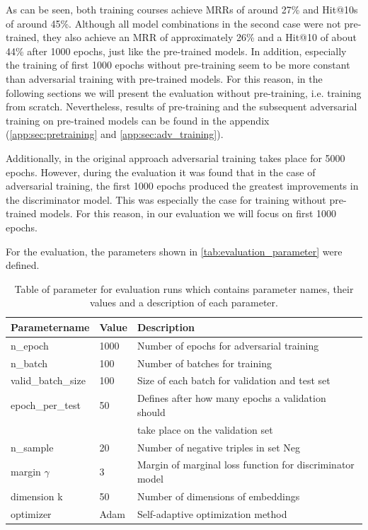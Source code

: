 As can be seen, both training courses achieve MRRs of around 27\% and Hit@10s of around 45\%.
Although all model combinations in the second case were not pre-trained, they also achieve an MRR of approximately 26\% and a Hit@10 of about 44\% after 1000 epochs, just like the pre-trained models.
In addition, especially the training of first 1000 epochs without pre-training seem to be more constant than adversarial training with pre-trained models.
For this reason, in the following sections we will present the evaluation without pre-training, i.e. training from scratch.
Nevertheless, results of pre-training and the subsequent adversarial training on pre-trained models can be found in the appendix (\autoref{app:sec:pretraining} and \ref{app:sec:adv_training}).

Additionally, in the original approach adversarial training takes place for 5000 epochs.
However, during the evaluation it was found that in the case of adversarial training, the first 1000 epochs produced the greatest improvements in the discriminator model.
This was especially the case for training without pre-trained models.
For this reason, in our evaluation we will focus on first 1000 epochs.

For the evaluation, the parameters shown in \autoref{tab:evaluation_parameter} were defined.
\begin{table}[h]
    \centering
    \begin{tabular}{lll}
        \toprule
        
        \textbf{Parametername} & 
        \textbf{Value} & 
        \textbf{Description} \\
    
        \midrule
         n\_epoch & 1000 & Number of epochs for adversarial training\\
         n\_batch & 100 & Number of batches for training \\
         
         valid\_batch\_size & 100 & Size of each batch for validation and test set\\
         epoch\_per\_test & 50 & Defines after how many epochs a validation should \\
         &  & take place on the validation set \\
         n\_sample & 20 & Number of negative triples in set Neg \\

        margin $\gamma$ & 3 & Margin of marginal loss function for discriminator model\\
        dimension k & 50 & Number of dimensions of embeddings \\ 
        optimizer & Adam & Self-adaptive optimization method \\

        \bottomrule
    \end{tabular}
    \caption{Table of parameter for evaluation runs which contains parameter names, their values and a description of each parameter.}
\label{tab:evaluation_parameter}
\end{table}



  
  
